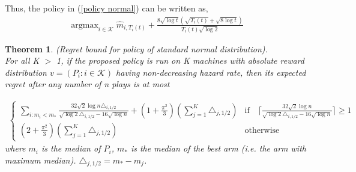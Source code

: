 \documentclass{article}
\DeclareMathOperator*{\argmax}{argmax}
\theoremstyle{plain}
\newtheorem{theo}{Theorem}
\begin{document}
Thus, the policy in (\ref{policy normal}) can be written as,
\begin{align}
    \argmax_{i \in \mathcal{K}} \hat{m}_{i, T_i(t)} + \frac{8 \sqrt{\log t} (\sqrt{ T_i(t)} + \sqrt{8\log t})}{T_i(t)  \sqrt{\log 2}}
\end{align}

\begin{theo}
(Regret bound for policy of standard normal distribution). \\

For all K $>$ 1, if the proposed policy is run on K machines with absolute reward distribution $v = (P_i: i \in \mathcal{K})$ having non-decreasing hazard rate, then its expected regret after any number of n plays is at most 

\begin{align}
    \begin{cases} 
          \sum_{i: m_i < m_\ast} \frac{32 \sqrt{2} \log n \triangle_{i, 1/2}}{\sqrt{\log 2} \triangle_{i, 1/2} - 16 \sqrt{\log n}} + (1 + \frac{\pi^2}{3}) (\sum_{j=1}^K \triangle_{j, 1/2}) &  \text{if} \quad  \lceil \frac{32 \sqrt{2} \log n}{\sqrt{\log 2} \triangle_{i, 1/2} - 16 \sqrt{\log n}} \rceil \geq 1 \\
          (2 + \frac{\pi^2}{3}) (\sum_{j=1}^K \triangle_{j, 1/2}) & \text{otherwise} 
   \end{cases}
\end{align}
where $m_i$ is the median of $P_i$, $m_\ast$ is the median of the best arm (i.e. the arm with maximum median). $\triangle_{j, 1/2} = m_\ast - m_j$.  
\end{theo}
\end{document}
